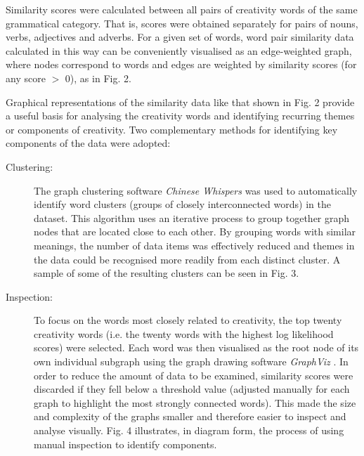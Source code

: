 \documentclass[10pt,letterpaper]{article}
\begin{document}
Similarity scores were calculated between all pairs of creativity words of the same grammatical category. That is, scores were obtained separately for pairs of nouns, verbs, adjectives and adverbs. For a given set of words, word pair similarity data calculated in this way can be conveniently visualised as an edge-weighted graph, where nodes  correspond to words and edges are weighted by similarity scores (for any score $>$ 0), as in Fig. 2. %

  

Graphical representations of the similarity data like that shown in Fig. 2 %
provide a useful basis for analysing the creativity words and identifying recurring themes or components of creativity. Two complementary methods for identifying key components of the data were adopted:






\begin{description}

\item[Clustering:] The graph clustering software {\em Chinese Whispers} \cite{biemann06} was used to automatically identify word clusters (groups of closely interconnected words) in the dataset. This algorithm uses an iterative process to group together graph nodes that are located close to each other. By grouping words with similar meanings, the number of data items was effectively reduced and themes in the data could be recognised more readily from each distinct cluster. A sample of some of the resulting clusters can be seen in Fig. 3. %

\item[Inspection:] To focus on the words most closely related to creativity, the top twenty creativity words (i.e. the twenty  words with the highest log likelihood scores) were selected. Each word was then visualised as the root node of its own individual subgraph using the graph drawing software {\em GraphViz} \cite{graphviz}. In order to reduce the amount of data to be examined, similarity scores were discarded if they fell below a threshold value (adjusted manually for each graph to highlight the most strongly connected words). This made the size and complexity of the graphs smaller and therefore easier to inspect and analyse visually. Fig. 4 %
illustrates, in diagram form, the process of using manual inspection to identify components. 

\end{description}
\end{document}
